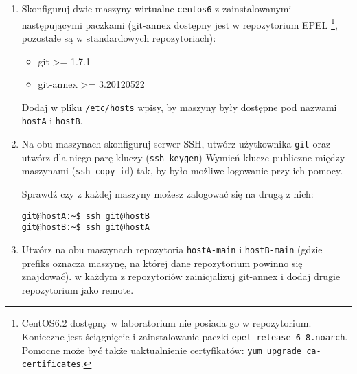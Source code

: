\documentclass[polish]{article}
\newif\ifteacher
\begin{document}
\begin{enumerate}

    \item
    Skonfiguruj dwie maszyny wirtualne \texttt{centos6} z zainstalowanymi
    następującymi paczkami (git-annex dostępny jest w repozytorium EPEL
    \footnote{CentOS6.2 dostępny w laboratorium nie posiada go w repozytorium.
        Konieczne jest ściągnięcie i zainstalowanie paczki
        \texttt{epel-release-6-8.noarch}. Pomocne może być także uaktualnienie
        certyfikatów: \texttt{yum upgrade ca-certificates}.},
    pozostałe są w standardowych repozytoriach):

    \begin{itemize}
      \item git >= 1.7.1
      \item git-annex >= 3.20120522
    \end{itemize}

    Dodaj w pliku \texttt{/etc/hosts} wpisy, by maszyny były dostępne pod
    nazwami \texttt{hostA} i \texttt{hostB}.

\ifteacher
    \begin{lstlisting}
yum upgrade ca-certificates

wget http://download.fedoraproject.org/pub/epel/6/x86_64/epel-release-6-8.noarch.rpm
rpm -ivh epel-release-6-8.noarch.rpm
    \end{lstlisting}
\fi

    \item
    Na obu maszynach skonfiguruj serwer SSH, utwórz użytkownika \texttt{git}
    oraz utwórz dla niego parę kluczy (\texttt{ssh-keygen}) Wymień klucze
    publiczne między maszynami (\texttt{ssh-copy-id}) tak, by było możliwe
    logowanie przy ich pomocy.

    Sprawdź czy z każdej maszyny możesz zalogować się na drugą z nich:

    \begin{lstlisting}
git@hostA:~$ ssh git@hostB
git@hostB:~$ ssh git@hostA
    \end{lstlisting}

    \item
    Utwórz na obu maszynach repozytoria \texttt{hostA-main} i
    \texttt{hostB-main} (gdzie prefiks oznacza maszynę, na której dane
    repozytorium powinno się znajdować). w każdym z repozytoriów zainicjalizuj
    git-annex i dodaj drugie repozytorium jako remote.


\end{enumerate}
\end{document}
